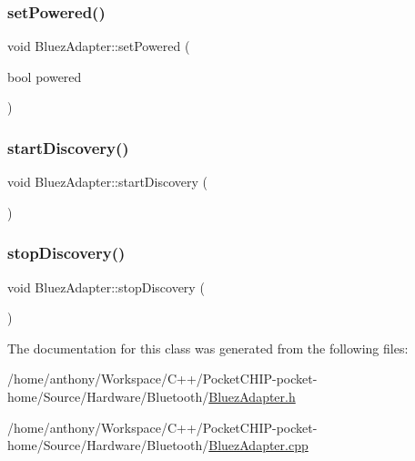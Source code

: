 \subsubsection{\texorpdfstring{set\+Powered()}{setPowered()}}
{\footnotesize\ttfamily void Bluez\+Adapter\+::set\+Powered (\begin{DoxyParamCaption}\item[{bool}]{powered }\end{DoxyParamCaption})}

\mbox{\label{classBluezAdapter_a7151568b9de977c65373399d34155a58}} 
\subsubsection{\texorpdfstring{start\+Discovery()}{startDiscovery()}}
{\footnotesize\ttfamily void Bluez\+Adapter\+::start\+Discovery (\begin{DoxyParamCaption}{ }\end{DoxyParamCaption})}

\mbox{\label{classBluezAdapter_a0f5b87579212656ab24d33f662f72522}} 
\subsubsection{\texorpdfstring{stop\+Discovery()}{stopDiscovery()}}
{\footnotesize\ttfamily void Bluez\+Adapter\+::stop\+Discovery (\begin{DoxyParamCaption}{ }\end{DoxyParamCaption})}



The documentation for this class was generated from the following files\+:\begin{DoxyCompactItemize}
\item 
/home/anthony/\+Workspace/\+C++/\+Pocket\+C\+H\+I\+P-\/pocket-\/home/\+Source/\+Hardware/\+Bluetooth/\mbox{\hyperlink{BluezAdapter_8h}{Bluez\+Adapter.\+h}}\item 
/home/anthony/\+Workspace/\+C++/\+Pocket\+C\+H\+I\+P-\/pocket-\/home/\+Source/\+Hardware/\+Bluetooth/\mbox{\hyperlink{BluezAdapter_8cpp}{Bluez\+Adapter.\+cpp}}\end{DoxyCompactItemize}
